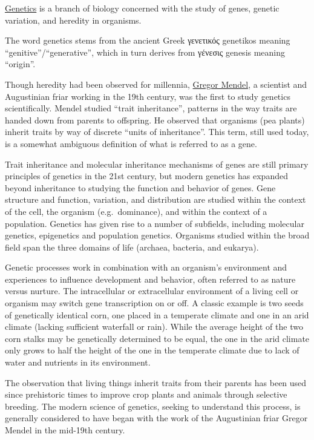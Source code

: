 \href{https://en.wikipedia.org/wiki/Genetics}{Genetics} is a branch of biology concerned with the study of genes, genetic variation, and heredity in organisms.

The word genetics stems from the ancient Greek γενετικός genetikos meaning ``genitive''/``generative'', which in turn derives from γένεσις genesis meaning ``origin''.

Though heredity had been observed for millennia, \href{https://en.wikipedia.org/wiki/Gregor_Mendel}{Gregor Mendel}, a scientist and Augustinian friar working in the 19th century, was the first to study genetics scientifically. Mendel studied ``trait inheritance'', patterns in the way traits are handed down from parents to offspring. He observed that organisms (pea plants) inherit traits by way of discrete ``units of inheritance''. This term, still used today, is a somewhat ambiguous definition of what is referred to as a gene.

Trait inheritance and molecular inheritance mechanisms of genes are still primary principles of genetics in the 21st century, but modern genetics has expanded beyond inheritance to studying the function and behavior of genes. Gene structure and function, variation, and distribution are studied within the context of the cell, the organism (e.g.~dominance), and within the context of a population. Genetics has given rise to a number of subfields, including molecular genetics, epigenetics and population genetics. Organisms studied within the broad field span the three domains of life (archaea, bacteria, and eukarya).

Genetic processes work in combination with an organism's environment and experiences to influence development and behavior, often referred to as nature versus nurture. The intracellular or extracellular environment of a living cell or organism may switch gene transcription on or off. A classic example is two seeds of genetically identical corn, one placed in a temperate climate and one in an arid climate (lacking sufficient waterfall or rain). While the average height of the two corn stalks may be genetically determined to be equal, the one in the arid climate only grows to half the height of the one in the temperate climate due to lack of water and nutrients in its environment.

The observation that living things inherit traits from their parents has been used since prehistoric times to improve crop plants and animals through selective breeding. The modern science of genetics, seeking to understand this process, is generally considered to have began with the work of the Augustinian friar Gregor Mendel in the mid-19th century.

